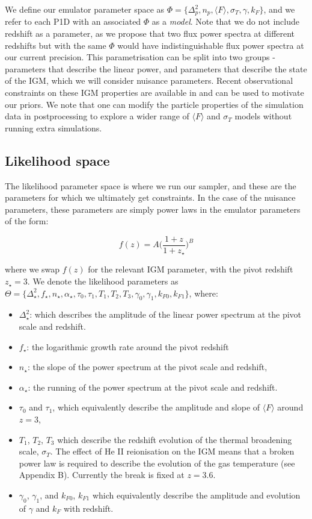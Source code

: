 \documentclass[]{article}
\begin{document}
\noindent We define our emulator parameter space as $\Phi=\{ \Delta^2_p,n_p,\langle F\rangle,\sigma_T,\gamma,k_F \}$, and we refer to each P1D with an associated 
$\Phi$ as a \textit{model}. Note that we do not include redshift as a parameter, as we 
propose that two flux power spectra at different redshifts but with the same $\Phi$ would 
have indistinguishable flux power spectra at our current precision. This parametrisation 
can be split into two groups - parameters that describe the linear power, and parameters 
that describe the state of the IGM, which we will consider nuisance parameters. Recent 
observational constraints on these IGM properties are available in \cite{Walther2018} and 
can be used to motivate our priors. We note that one can modify the particle properties 
of the simulation data in postprocessing to explore a wider range of $\langle F\rangle$ 
and $\sigma_T$ models without running extra simulations.

\subsection{Likelihood space}
The likelihood parameter space is where we run our sampler, and these are the parameters 
for which we ultimately get constraints. In the case of the nuisance parameters, these
parameters are simply power laws in the emulator parameters of the form:

\begin{equation}
    f(z)=A\bigg(\frac{1+z}{1+z_\star}\bigg)^B
\end{equation}

\noindent where we swap $f(z)$ for the relevant IGM parameter, with the pivot 
redshift $z_\star=3$. We denote the likelihood parameters as $\Theta=\{ \Delta^2_\star, f_\star, n_\star, \alpha_\star, \tau_0, \tau_1, T_1, T_2, T_3, \gamma_0, \gamma_1, k_{F0}, k_{F1} \}$, where:

\begin{itemize}
    \item $\Delta^2_\star$: which describes the amplitude of the linear power spectrum at 
    the pivot scale and redshift.
    \item $f_\star$: the logarithmic growth rate around the pivot redshift
    \item $n_\star$: the slope of the power spectrum at the pivot scale and redshift,
    \item $\alpha_\star$: the running of the power spectrum at the pivot scale and redshift.
    \item  $\tau_0$ and $\tau_1$, which equivalently describe the amplitude and slope of $\langle F\rangle$ around $z=3$,
    \item  $T_1$, $T_2$, $T_3$ which describe the redshift evolution of the thermal 
    broadening scale, $\sigma_T$. The effect of He II reionisation on the IGM means that 
    a broken power law is required to describe the evolution of the gas temperature (see 
    Appendix B). Currently the break is fixed at $z=3.6$.
    \item $\gamma_0$, $\gamma_1$, and $k_{F0}$, $k_{F1}$ which equivalently describe the amplitude and evolution of $\gamma$ and $k_F$ with redshift.
\end{itemize}
\end{document}
